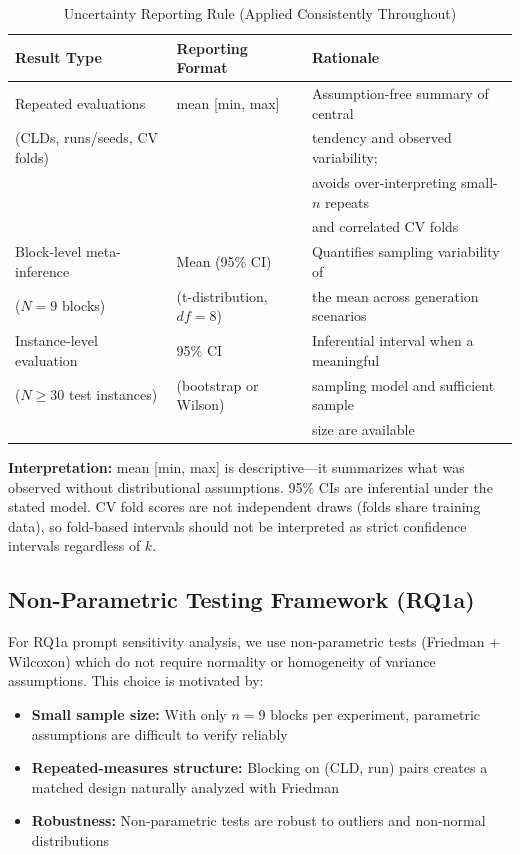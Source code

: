 \begin{table}[H]
\centering
\caption{Uncertainty Reporting Rule (Applied Consistently Throughout)}
\label{tab:uncertainty_rule}
\footnotesize
\begin{tabular}{@{}l l l@{}}
\toprule
\textbf{Result Type} & \textbf{Reporting Format} & \textbf{Rationale} \\
\midrule
Repeated evaluations & mean [min, max] & Assumption-free summary of central \\
(CLDs, runs/seeds, CV folds) & & tendency and observed variability; \\
 & & avoids over-interpreting small-$n$ repeats \\
 & & and correlated CV folds \\
\midrule
Block-level meta-inference & Mean (95\% CI) & Quantifies sampling variability of \\
($N=9$ blocks) & (t-distribution, $df=8$) & the mean across generation scenarios \\
\midrule
Instance-level evaluation & 95\% CI & Inferential interval when a meaningful \\
($N \geq 30$ test instances) & (bootstrap or Wilson) & sampling model and sufficient sample \\
 & & size are available \\
\bottomrule
\end{tabular}
\end{table}

\textbf{Interpretation:} mean [min, max] is descriptive---it summarizes what was observed without distributional assumptions. 95\% CIs are inferential under the stated model. CV fold scores are not independent draws (folds share training data), so fold-based intervals should not be interpreted as strict confidence intervals regardless of $k$.

\subsection{Non-Parametric Testing Framework (RQ1a)}

For RQ1a prompt sensitivity analysis, we use non-parametric tests (Friedman + Wilcoxon) which do not require normality or homogeneity of variance assumptions. This choice is motivated by:
\begin{itemize}[noitemsep]
    \item \textbf{Small sample size:} With only $n=9$ blocks per experiment, parametric assumptions are difficult to verify reliably
    \item \textbf{Repeated-measures structure:} Blocking on (CLD, run) pairs creates a matched design naturally analyzed with Friedman
    \item \textbf{Robustness:} Non-parametric tests are robust to outliers and non-normal distributions
\end{itemize}

